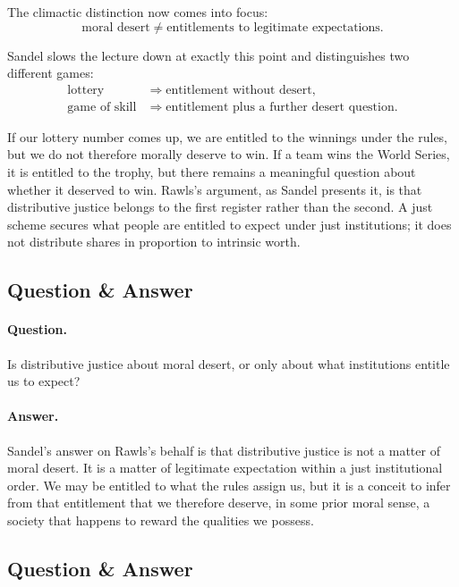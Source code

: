 The climactic distinction now comes into focus:
\begin{equation}
\text{moral desert}\neq\text{entitlements to legitimate expectations}.
\end{equation}

Sandel slows the lecture down at exactly this point and distinguishes two different games:
\begin{align}
\text{lottery} &\Longrightarrow \text{entitlement without desert},\\
\text{game of skill} &\Longrightarrow \text{entitlement plus a further desert question}.
\end{align}

If our lottery number comes up, we are entitled to the winnings under the rules, but we do not therefore morally deserve to win. If a team wins the World Series, it is entitled to the trophy, but there remains a meaningful question about whether it deserved to win. Rawls's argument, as Sandel presents it, is that distributive justice belongs to the first register rather than the second. A just scheme secures what people are entitled to expect under just institutions; it does not distribute shares in proportion to intrinsic worth.

\subsection{Question \& Answer}

\paragraph{Question.} Is distributive justice about moral desert, or only about what institutions entitle us to expect?

\paragraph{Answer.} Sandel's answer on Rawls's behalf is that distributive justice is not a matter of moral desert. It is a matter of legitimate expectation within a just institutional order. We may be entitled to what the rules assign us, but it is a conceit to infer from that entitlement that we therefore deserve, in some prior moral sense, a society that happens to reward the qualities we possess.

\subsection{Question \& Answer}

